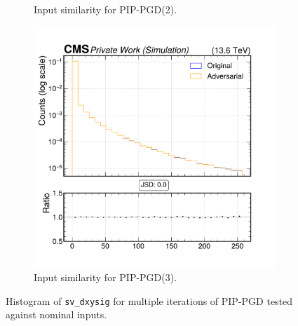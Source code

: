 \begin{figure}[h]
\begin{subfigure}[t]{0.32\textwidth}
    \caption*{Input similarity for PIP-PGD(2).}
  \end{subfigure}\hfill
  \begin{subfigure}[t]{0.32\textwidth}
    \includegraphics[width=\linewidth]{media/output/features/compare/combined_it_3/cmp_vtx_arr_sv_dxysig.pdf}
    \caption*{Input similarity for PIP-PGD(3).}
  \end{subfigure}

  \caption*{Histogram of \texttt{sv\_dxysig} for multiple iterations of PIP-PGD tested against nominal inputs.}
  \label{fig:combined_input_sv_dxysig}
\end{figure}

